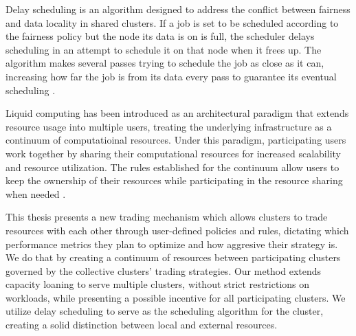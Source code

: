 Delay scheduling is an algorithm designed to address the conflict between
fairness and data locality in shared clusters. If a job is set to be scheduled
according to the fairness policy but the node its data is on is full, the
scheduler delays scheduling in an attempt to schedule it on that node when
it frees up. The algorithm makes several passes trying to schedule the job as
close as it can, increasing how far the job is from its data every pass to
guarantee its eventual scheduling \cite{zaharia_delay_2010}.

Liquid computing has been introduced as an architectural paradigm that extends
resource usage into multiple users, treating the underlying infrastructure as a
continuum of computatioinal resources. Under this paradigm, participating users
work together by sharing their computational resources for increased
scalability and resource utilization. The rules established for the continuum
allow users to keep the ownership of their resources while participating in the
resource sharing when needed \cite{iorio_computing_2023, noauthor_liqo_nodate}.

This thesis presents a new trading mechanism which allows clusters to trade
resources with each other through user-defined policies and rules, dictating
which performance metrics they plan to optimize and how aggresive their
strategy is. We do that by creating a continuum of resources between
participating clusters governed by the collective clusters' trading strategies.
Our method extends capacity loaning to serve multiple clusters, without strict
restrictions on workloads, while presenting a possible incentive for all
participating clusters. We utilize delay scheduling to serve as the scheduling
algorithm for the cluster, creating a solid distinction between local and
external resources.


